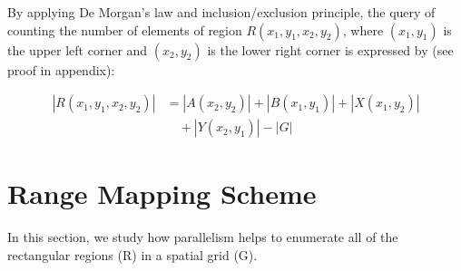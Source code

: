 \documentclass[10pt,journal,cspaper,compsoc]{IEEEtran}
\begin{document}
 By applying De Morgan's law and inclusion/exclusion principle, the query of counting the number of elements of region $R(x_1,y_1,x_2,y_2)$, where $(x_1,y_1)$ is the upper left corner and $(x_2,y_2)$ is the lower right corner is expressed by (see proof in appendix):

\small
\begin{equation}
\begin{split}
|R(x_1,y_1,x_2,y_2)|& = |A(x_2,y_2)| + |B(x_1,y_1)| + |X(x_1,y_2)| \\& \quad + |Y(x_2,y_1)| - |G|
\end{split}
\end{equation}
\normalsize

\section{Range Mapping Scheme}
In this section, we study how parallelism helps to enumerate all of the rectangular regions (R) in a spatial grid (G).
\end{document}
